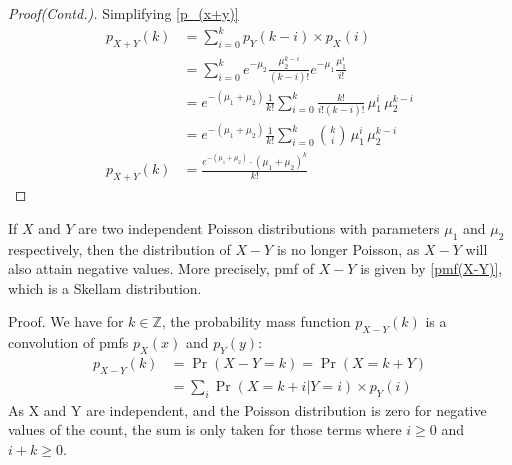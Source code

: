 \documentclass{beamer}
\providecommand{\pr}[1]{\ensuremath{\Pr\left(#1\right)}}
\begin{document}
\begin{frame}{}
    \begin{proof}[Proof(Contd.)]
        Simplifying \eqref{p_(x+y)}\vspace{-2mm}
    \begin{align}
        p_{X+Y}(k) &= \sum_{i=0}^k p_Y(k-i) \times p_X(i)\\
        &= \sum_{i=0}^k e^{-\mu_2}\frac{\mu_2^{k-i}}{(k-i)!}e^{-\mu_1}\frac{\mu_1^i}{i!}\\
        &= e^{-(\mu_1 + \mu_2)}\frac 1{k!}\sum_{i=0}^k \frac{k!}{i!(k-i)!}\,\mu_1^i\,\mu_2^{k-i}\\
        &= e^{-(\mu_1 + \mu_2)}\frac 1{k!}\sum_{i=0}^k {k\choose i}\, \mu_1^i\,\mu_2^{k-i}\\
        p_{X+Y}(k) &= \frac{e^{-(\mu_1 + \mu_2)} \cdot (\mu_1 + \mu_2)^k}{k!}
    \end{align}
    \end{proof}
\end{frame}
\begin{frame}{}
    \begin{lemma}[2]\label{lemma_X-Y}
    \vspace{-2mm}
        If $X$ and $Y$ are two independent Poisson distributions with parameters $\mu_1$ and $\mu_2$ respectively, then the distribution of $X-Y$ is no longer Poisson, as $X - Y$ will also attain negative values.  More precisely, pmf of $X-Y$ is given by \eqref{pmf(X-Y)}, which is a Skellam distribution.
    \end{lemma}
    \begin{block}{Proof.}
         We have for $k \in \mathbb{Z}$, the probability mass function $p_{X-Y}(k)$ is a convolution of pmfs $p_X(x)$ and $p_Y(y)$: 
    \begin{align}
       p_{X-Y}(k) &= \pr{X\! -\! Y\! =\! k} = \pr{X\! =\! k\! +\! Y}\\
       &= \sum_{i}\pr{X = k + i| Y = i}\times p_Y(i)\label{p_(x-y)}
    \end{align}
    As X and Y are independent, and the Poisson distribution is zero for negative values of the count, the sum is only taken for those terms where $i \geq 0$ and $i+k\geq 0$.
    \end{block}
\end{frame}
\end{document}
